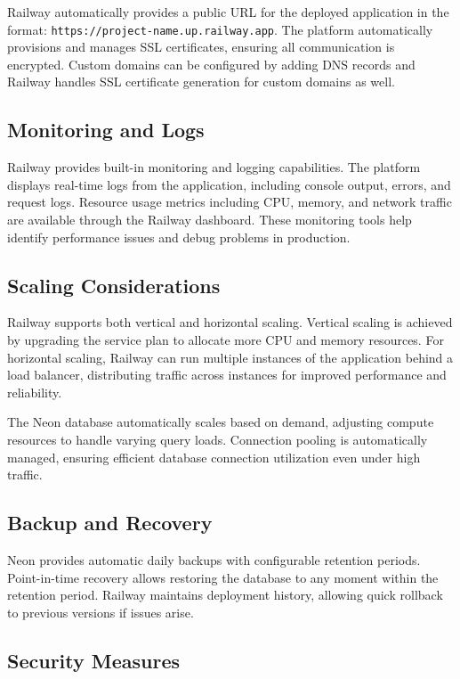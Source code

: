 Railway automatically provides a public URL for the deployed application in the format: \texttt{https://project-name.up.railway.app}. The platform automatically provisions and manages SSL certificates, ensuring all communication is encrypted. Custom domains can be configured by adding DNS records and Railway handles SSL certificate generation for custom domains as well.

\subsection{Monitoring and Logs}

Railway provides built-in monitoring and logging capabilities. The platform displays real-time logs from the application, including console output, errors, and request logs. Resource usage metrics including CPU, memory, and network traffic are available through the Railway dashboard. These monitoring tools help identify performance issues and debug problems in production.

\subsection{Scaling Considerations}

Railway supports both vertical and horizontal scaling. Vertical scaling is achieved by upgrading the service plan to allocate more CPU and memory resources. For horizontal scaling, Railway can run multiple instances of the application behind a load balancer, distributing traffic across instances for improved performance and reliability.

The Neon database automatically scales based on demand, adjusting compute resources to handle varying query loads. Connection pooling is automatically managed, ensuring efficient database connection utilization even under high traffic.

\subsection{Backup and Recovery}

Neon provides automatic daily backups with configurable retention periods. Point-in-time recovery allows restoring the database to any moment within the retention period. Railway maintains deployment history, allowing quick rollback to previous versions if issues arise.

\subsection{Security Measures}


